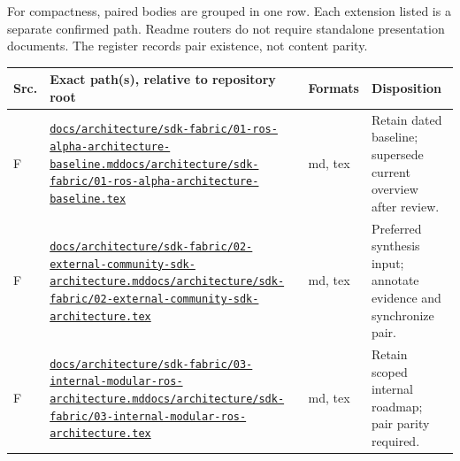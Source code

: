 \documentclass[
  10pt,
]{article}
\begin{document}
For compactness, paired bodies are grouped in one row. Each extension
listed is a separate confirmed path. Readme routers do not require
standalone presentation documents. The register records pair existence,
not content parity.

\begin{longtable}[]{@{}>{\raggedright\arraybackslash}p{}>{\raggedright\arraybackslash}p{}>{\raggedright\arraybackslash}p{}>{\raggedright\arraybackslash}p{}@{}}
\toprule\noalign{}
Src. & Exact path(s), relative to repository root & Formats &
Disposition \\
\midrule\noalign{}
\endhead
\bottomrule\noalign{}
\endlastfoot
F &
\href{https://github.com/vonstegen/2.0.0-alpha/blob/34a2be796ffc062605f1a638c1e666dafce88250/docs/architecture/sdk-fabric/01-ros-alpha-architecture-baseline.md}{\nolinkurl{docs/architecture/sdk-fabric/01-ros-alpha-architecture-baseline.md}}\href{https://github.com/vonstegen/2.0.0-alpha/blob/34a2be796ffc062605f1a638c1e666dafce88250/docs/architecture/sdk-fabric/01-ros-alpha-architecture-baseline.tex}{\nolinkurl{docs/architecture/sdk-fabric/01-ros-alpha-architecture-baseline.tex}}
& md, tex & Retain dated baseline; supersede current overview after
review. \\
F &
\href{https://github.com/vonstegen/2.0.0-alpha/blob/34a2be796ffc062605f1a638c1e666dafce88250/docs/architecture/sdk-fabric/02-external-community-sdk-architecture.md}{\nolinkurl{docs/architecture/sdk-fabric/02-external-community-sdk-architecture.md}}\href{https://github.com/vonstegen/2.0.0-alpha/blob/34a2be796ffc062605f1a638c1e666dafce88250/docs/architecture/sdk-fabric/02-external-community-sdk-architecture.tex}{\nolinkurl{docs/architecture/sdk-fabric/02-external-community-sdk-architecture.tex}}
& md, tex & Preferred synthesis input; annotate evidence and synchronize
pair. \\
F &
\href{https://github.com/vonstegen/2.0.0-alpha/blob/34a2be796ffc062605f1a638c1e666dafce88250/docs/architecture/sdk-fabric/03-internal-modular-ros-architecture.md}{\nolinkurl{docs/architecture/sdk-fabric/03-internal-modular-ros-architecture.md}}\href{https://github.com/vonstegen/2.0.0-alpha/blob/34a2be796ffc062605f1a638c1e666dafce88250/docs/architecture/sdk-fabric/03-internal-modular-ros-architecture.tex}{\nolinkurl{docs/architecture/sdk-fabric/03-internal-modular-ros-architecture.tex}}
& md, tex & Retain scoped internal roadmap; pair parity required. \\

\end{longtable}
\end{document}

